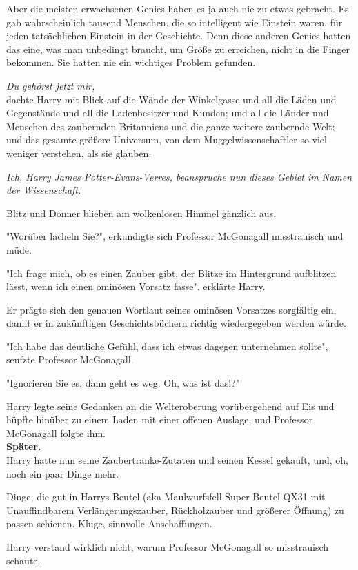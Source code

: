 {Aber die meisten erwachsenen Genies haben es ja auch nie zu etwas gebracht. Es gab wahrscheinlich tausend Menschen, die so intelligent wie Einstein waren, für jeden tatsächlichen Einstein in der Geschichte. Denn diese anderen Genies hatten das eine, was man unbedingt braucht, um Größe zu erreichen, nicht in die Finger bekommen. Sie hatten nie ein wichtiges Problem gefunden.

\emph{Du gehörst jetzt mir,}\\ dachte Harry mit Blick auf die Wände der Winkelgasse und all die Läden und Gegenstände und all die Ladenbesitzer und Kunden; und all die Länder und Menschen des zaubernden Britanniens und die ganze weitere zaubernde Welt; und das gesamte größere Universum, von dem Muggelwissenschaftler so viel weniger verstehen, als sie glauben.

\emph{Ich, Harry James Potter-Evans-Verres, beanspruche nun dieses Gebiet im Namen der Wissenschaft.}

Blitz und Donner blieben am wolkenlosen Himmel gänzlich aus.

"Worüber lächeln Sie?", erkundigte sich Professor McGonagall misstrauisch und müde.

"Ich frage mich, ob es einen Zauber gibt, der Blitze im Hintergrund aufblitzen lässt, wenn ich einen ominösen Vorsatz fasse", erklärte Harry.

Er prägte sich den genauen Wortlaut seines ominösen Vorsatzes sorgfältig ein, damit er in zukünftigen Geschichtsbüchern richtig wiedergegeben werden würde.

"Ich habe das deutliche Gefühl, dass ich etwas dagegen unternehmen sollte", seufzte Professor McGonagall.

"Ignorieren Sie es, dann geht es weg. Oh, was ist das!?"

Harry legte seine Gedanken an die Welteroberung vorübergehend auf Eis und hüpfte hinüber zu einem Laden mit einer offenen Auslage, und Professor McGonagall folgte ihm.\\ \textbf{Später.}\\ Harry hatte nun seine Zaubertränke-Zutaten und seinen Kessel gekauft, und, oh, noch ein paar Dinge mehr.

Dinge, die gut in Harrys Beutel (aka Maulwurfsfell Super Beutel QX31 mit Unauffindbarem Verlängerungszauber, Rückholzauber und größerer Öffnung) zu passen schienen. Kluge, sinnvolle Anschaffungen.

Harry verstand wirklich nicht, warum Professor McGonagall so misstrauisch schaute.

}
